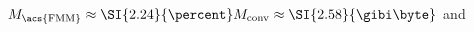 $M_{\text{\acs{FMM}}} \approx \SI{2.24}{\percent} M_{\text{conv}} \approx \SI{2.58}{\gibi\byte}$ and
